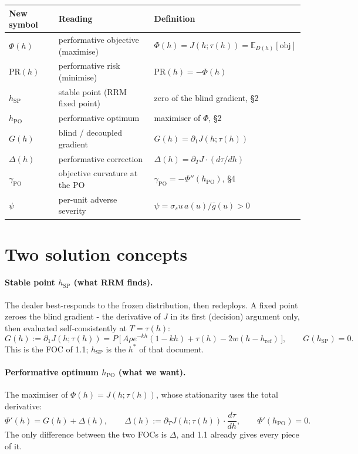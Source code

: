 \documentclass[11pt]{article}
\newcommand{\gbar}{\bar g}
\newcommand{\href}{h_{\mathrm{ref}}}
\newcommand{\hSP}{h_{\mathrm{SP}}}
\newcommand{\hPO}{h_{\mathrm{PO}}}
\newcommand{\gPO}{\gamma_{\mathrm{PO}}}
\begin{document}
\begin{center}
\begin{tabular}{@{}lll@{}}
\toprule
New symbol & Reading & Definition \\
\midrule
$\Phi(h)$ & performative objective (maximise) & $\Phi(h)=J(h;\tau(h))=\mathbb{E}_{D(h)}[\text{obj}]$ \\
$\mathrm{PR}(h)$ & performative risk (minimise) & $\mathrm{PR}(h)=-\Phi(h)$ \\
$\hSP$ & stable point (RRM fixed point) & zero of the blind gradient, \S2 \\
$\hPO$ & performative optimum & maximiser of $\Phi$, \S2 \\
$G(h)$ & blind / decoupled gradient & $G(h)=\partial_1 J(h;\tau(h))$ \\
$\Delta(h)$ & performative correction & $\Delta(h)=\partial_T J\cdot(d\tau/dh)$ \\
$\gPO$ & objective curvature at the PO & $\gPO=-\Phi''(\hPO)$, \S4 \\
$\psi$ & per-unit adverse severity & $\psi=\sigma_s u\,a(u)/\gbar(u)>0$ \\
\bottomrule
\end{tabular}
\end{center}

\section{Two solution concepts}

\paragraph{Stable point $\hSP$ (what RRM finds).}
The dealer best-responds to the frozen distribution, then redeploys. A fixed
point zeroes the blind gradient - the derivative of $J$ in its first (decision)
argument only, then evaluated self-consistently at $T=\tau(h)$:
%
\begin{equation}\label{eq:blind}
  G(h) := \partial_1 J(h;\tau(h))
  = P\,\big[\, A\rho e^{-kh}(1-kh) + \tau(h) - 2w(h-\href) \,\big],
  \qquad G(\hSP)=0.
\end{equation}
%
This is the FOC of 1.1; $\hSP$ is the $h^*$ of that document.

\paragraph{Performative optimum $\hPO$ (what we want).}
The maximiser of $\Phi(h)=J(h;\tau(h))$, whose stationarity uses the total
derivative:
%
\begin{equation}\label{eq:total}
  \Phi'(h) = G(h) + \Delta(h),\qquad
  \Delta(h):=\partial_T J(h;\tau(h))\cdot\frac{d\tau}{dh},\qquad
  \Phi'(\hPO)=0.
\end{equation}
%
The only difference between the two FOCs is $\Delta$, and 1.1 already gives every
piece of it.
\end{document}
